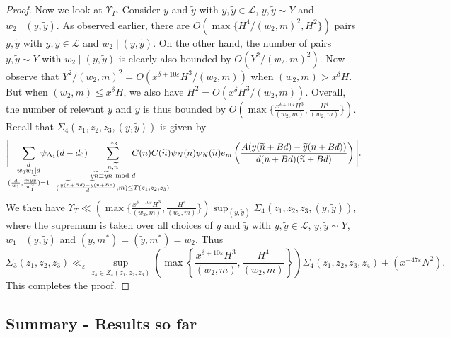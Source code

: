 \documentclass{amsart}
\numberwithin{equation}{section}
\begin{document}
\begin{proof}
Now we look at $\Upsilon_T$. Consider $y$ and $\widetilde{y}$ with $y, \widetilde{y} \in \mathcal{L}$, $y, \widetilde{y} \sim Y$ and  $w_2 \mid (y,\widetilde{y})$.  As observed earlier, there are $O(\max\{H^4/(w_2,m)^2, H^2\})$ pairs $y, \widetilde{y}$ with $y, \widetilde{y} \in \mathcal{L}$ and  $w_2 \mid (y, \widetilde{y})$. 
On the other hand, the number of pairs $y, \widetilde{y} \sim Y$ with $w_2 \mid (y,\widetilde{y})$ is clearly also bounded by $O(Y^2/ (w_2,m)^2)$. Now observe that $Y^2/(w_2,m)^2 = O(x^{\delta+10\varepsilon}H^3/ (w_2,m))$ when $ (w_2,m) > x^\delta H$. But when $(w_2,m) \leq x^{\delta}H$, we also have $H^2 = O(x^{\delta}H^3/(w_2,m))$.  Overall, the number of relevant $y$ and $\widetilde{y}$ is thus bounded by $O(\max\{\frac{x^{\delta+10\varepsilon}H^3}{ (w_2,m)}, \frac{H^4}{ (w_2,m)}\})$. 
Recall that $\Sigma_4(z_1,z_2,z_3,(y, \widetilde{y}))$ is given by
\begin{align*}
\Bigg|\!\!\sum_{\substack{d \\ w_0w_1 \mid d  \\  (\frac{d}{w_1}, \frac{my\widetilde{y}}{w_1^2})=1}}\!\!\!\!\!\!\!\psi_{\Delta_1}(d-d_0) \!\!\!\!\!\!\!\!\!\!\!\!\!\!\!\!\!\!\!\!\!\!\sum_{\substack{n, \widetilde{n}   \\ y\widetilde{n} \equiv 
\widetilde{y}n  \mbox{ \scriptsize mod } d \\ (\frac{y (\widetilde{n} +Bd)-\widetilde{y}(n+Bd)}{d},m ) \leq T(z_1,z_2,z_3)}}^{\,\,*_3}  \!\!\!\!\!\!\!\!\!\!\!\!\!\!\!\!\!\!\!\!\!\!\!\!\!\! C(n)  C(\widetilde{n})\psi_N(n)\psi_N(\widetilde{n}) e_{m}\left(\dfrac{A (y(\widetilde{n}+B d)-  \widetilde{y}(n+B d))}{d(n+B d)(\widetilde{n}+B d)}\right)\Bigg|.
\end{align*}
We then have $\Upsilon_T \ll (\max\{\frac{x^{\delta+10\varepsilon}H^3}{ (w_2,m)}, \frac{H^4}{ (w_2,m)}\}) \sup_{(y,\widetilde{y})} \Sigma_4(z_1,z_2,z_3,(y, \widetilde{y}))$, where the supremum is taken over all choices of $y$ and $\widetilde{y}$ with $y, \widetilde{y} \in \mathcal{L}$, $y, \widetilde{y} \sim Y$, $w_1\mid (y, \widetilde{y})$ and $(y,m^*)=(\widetilde{y},m^*)=w_2$. Thus
$$\Sigma_3(z_1,z_2,z_3)  \ll_\varepsilon  \sup_{z_4 \in Z_4(z_1,z_2,z_3)}  \left(\max\left\{\frac{x^{\delta+10\varepsilon}H^3}{ (w_2,m)}, \frac{H^4}{ (w_2,m)}\right\}\right) \Sigma_4(z_1,z_2,z_3,z_4) + (x^{-47\varepsilon}  N^2).$$
This completes the proof. 
\end{proof} 
 


 
\subsection{Summary - Results so far}
\end{document}
